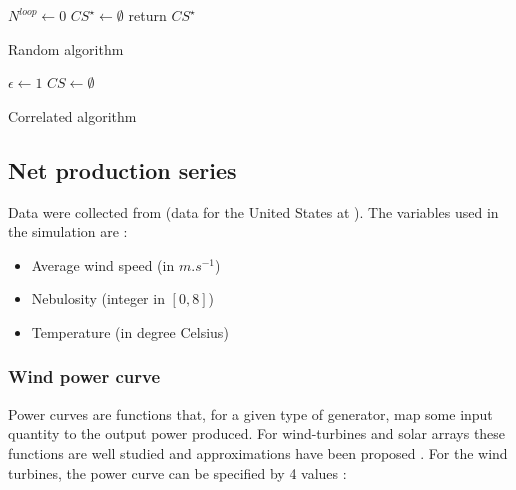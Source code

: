 \documentclass[journal]{IEEEtran}
\begin{document}
\begin{algorithm}
 $ N^{loop} \leftarrow 0 $ \;
 $ CS^{\star} \leftarrow \emptyset $\;
  return $ CS^{\star} $
 \caption{Random algorithm}
 \label{alg:algo2}
\end{algorithm}

\begin{algorithm}
 $ \epsilon \leftarrow 1 $ \;
 $ CS \leftarrow \emptyset $\;
 \caption{Correlated algorithm}
\label{alg:algo3}
\end{algorithm}


\subsection{Net production series}\label{appendixB}

Data were collected from \cite{Infoclimat} (data for the United States at \cite{NCDC}). The variables used in the simulation are :

\begin{itemize}
\item Average wind speed (in $m.s^{-1}$)
\item Nebulosity (integer in $[0,8] $)
\item Temperature (in degree Celsius)
\end{itemize} 

\subsubsection{Wind power curve}
Power curves are functions that, for a given type of generator, map some input quantity to the output power produced. For wind-turbines and solar arrays these functions are well studied and approximations have been proposed \cite{Lydia2014} \cite{Piedallu2007, Piedallu2008}. For the wind turbines, the power curve can be specified by 4 values :
\end{document}
